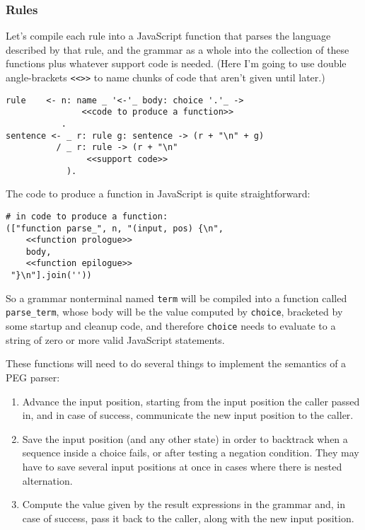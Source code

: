\documentclass[
]{article}
\providecommand{\tightlist}{%
  \setlength{\itemsep}{0pt}\setlength{\parskip}{0pt}}
\begin{document}
\hypertarget{rules}{%
\subsubsection{Rules}\label{rules}}

Let's compile each rule into a JavaScript function that parses the
language described by that rule, and the grammar as a whole into the
collection of these functions plus whatever support code is needed.
(Here I'm going to use double angle-brackets
\texttt{\textless{}\textless{}\textgreater{}\textgreater{}} to name
chunks of code that aren't given until later.)

\begin{verbatim}
rule    <- n: name _ '<-'_ body: choice '.'_ ->
               <<code to produce a function>>
           .
sentence <- _ r: rule g: sentence -> (r + "\n" + g)
          / _ r: rule -> (r + "\n"
                <<support code>>
            ).
\end{verbatim}

The code to produce a function in JavaScript is quite straightforward:

\begin{verbatim}
# in code to produce a function:
(["function parse_", n, "(input, pos) {\n",
    <<function prologue>>
    body, 
    <<function epilogue>>
 "}\n"].join(''))
\end{verbatim}

So a grammar nonterminal named \texttt{term} will be compiled into a
function called \texttt{parse\_term}, whose body will be the value
computed by \texttt{choice}, bracketed by some startup and cleanup code,
and therefore \texttt{choice} needs to evaluate to a string of zero or
more valid JavaScript statements.

These functions will need to do several things to implement the
semantics of a PEG parser:

\begin{enumerate}
\def\labelenumi{\arabic{enumi}.}
\tightlist
\item
  Advance the input position, starting from the input position the
  caller passed in, and in case of success, communicate the new input
  position to the caller.
\item
  Save the input position (and any other state) in order to backtrack
  when a sequence inside a choice fails, or after testing a negation
  condition. They may have to save several input positions at once in
  cases where there is nested alternation.
\item
  Compute the value given by the result expressions in the grammar and,
  in case of success, pass it back to the caller, along with the new
  input position.
\end{enumerate}
\end{document}
